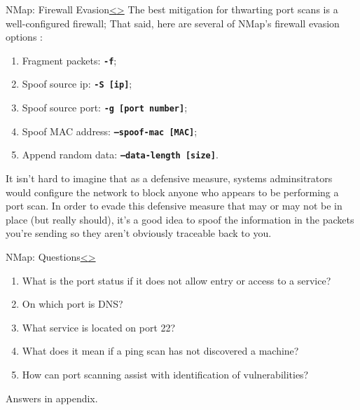 \documentclass[12pt]{article}
\newcommand{\code}[1]{\texttt{\bfseries#1}}
\newenvironment{instructionblock}{\Large\bgroup}{\egroup}
\begin{document}
\pagebreak
\begin{slide}{NMap: Firewall Evasion}{\hyperref[slide 12]{\textless}\hyperref[slide 14]{\textgreater}}
\begin{instructionblock}
The best mitigation for thwarting port scans is a well-configured firewall; That said, here are several of NMap's firewall evasion options \cite{rtfm}:
\begin{enumerate}
\item Fragment packets: \code{-f};
\item Spoof source ip: \code{-S [ip]};
\item Spoof source port: \code{-g [port number]};
\item Spoof MAC address: \code{--spoof-mac [MAC]};
\item Append random data: \code{--data-length [size]}.
\end{enumerate}
\end{instructionblock}
\end{slide}
It isn't hard to imagine that as a defensive measure, systems adminsitrators would configure the network to block anyone who appears to be performing a port scan. In order to evade this defensive measure that may or may not be in place (but really should), it's a good idea to spoof the information in the packets you're sending so they aren't obviously traceable back to you.


\pagebreak
\begin{slide}{NMap: Questions}{\hyperref[slide 13]{\textless}\hyperref[slide 15]{\textgreater}}
\begin{instructionblock}
\begin{enumerate}
\item What is the port status if it does not allow entry or access to a service?
\item On which port is DNS?
\item What service is located on port 22?
\item What does it mean if a ping scan has not discovered a machine?
\item How can port scanning assist with identification of vulnerabilities?
\end{enumerate}
\end{instructionblock}
\end{slide}
Answers in appendix.
\end{document}
